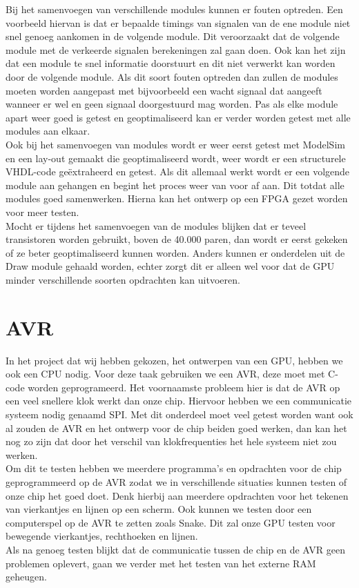 \documentclass{scrartcl} %
\begin{document}
Bij het samenvoegen van verschillende modules kunnen er fouten optreden. Een voorbeeld hiervan is dat er bepaalde timings van signalen van de ene module niet snel genoeg aankomen in de volgende module.
Dit veroorzaakt dat de volgende module met de verkeerde signalen berekeningen zal gaan doen. Ook kan het zijn dat een module te snel informatie doorstuurt en dit niet verwerkt kan worden door de volgende module.
Als dit soort fouten optreden dan zullen de modules moeten worden aangepast met bijvoorbeeld een wacht signaal dat aangeeft wanneer er wel en geen signaal doorgestuurd mag worden. Pas als elke module apart weer goed is getest en geoptimaliseerd kan er verder worden getest met alle modules aan elkaar.\\
Ook bij het samenvoegen van modules wordt er weer eerst getest met ModelSim en een lay-out gemaakt die geoptimaliseerd wordt, weer wordt er een structurele VHDL-code geëxtraheerd en getest. Als dit allemaal werkt wordt er een volgende module aan gehangen en begint het proces weer van voor af aan. Dit totdat alle modules goed samenwerken. Hierna kan het ontwerp op een FPGA gezet worden voor meer testen.\\
Mocht er tijdens het samenvoegen van de modules blijken dat er teveel transistoren worden gebruikt, boven de 40.000 paren, dan wordt er eerst gekeken of ze beter geoptimaliseerd kunnen worden. Anders kunnen er onderdelen uit de Draw module gehaald worden, echter zorgt dit er alleen wel voor dat de GPU minder verschillende soorten opdrachten kan uitvoeren.


\section{AVR}

In het project dat wij hebben gekozen, het ontwerpen van een GPU, hebben we ook een CPU nodig. Voor deze taak gebruiken we een AVR, deze moet met C-code worden geprogrameerd. Het voornaamste probleem hier is dat de AVR op een veel snellere klok werkt dan onze chip. Hiervoor hebben we een communicatie systeem nodig genaamd SPI. Met dit onderdeel moet veel getest worden want ook al zouden de AVR en het ontwerp voor de chip beiden goed werken, dan kan het nog zo zijn dat door het verschil van klokfrequenties het hele systeem niet zou werken.\\
Om dit te testen hebben we meerdere programma's en opdrachten voor de chip geprogrammeerd op de AVR zodat we in verschillende situaties kunnen testen of onze chip het goed doet. Denk hierbij aan meerdere opdrachten voor het tekenen van vierkantjes en lijnen op een scherm. Ook kunnen we testen door een computerspel op de AVR te zetten zoals Snake. Dit zal onze GPU testen voor bewegende vierkantjes, rechthoeken en lijnen.\\
Als na genoeg testen blijkt dat de communicatie tussen de chip en de AVR geen problemen oplevert, gaan we verder met het testen van het externe RAM geheugen.
\end{document}
